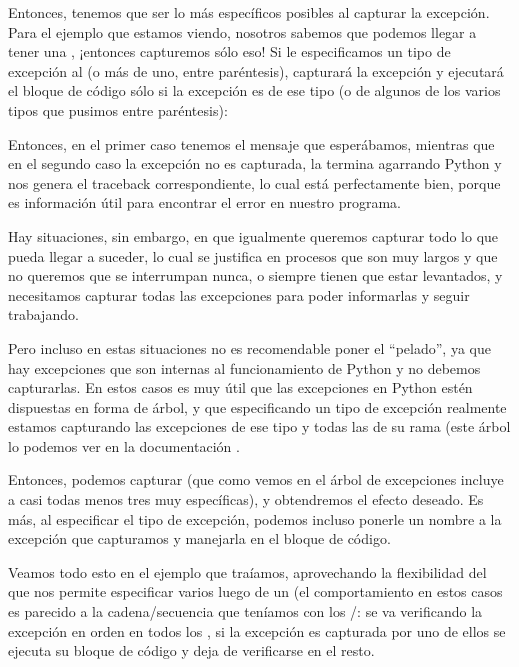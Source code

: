 Entonces, tenemos que ser lo más específicos posibles al capturar la excepción. Para el ejemplo que estamos viendo, nosotros sabemos que podemos llegar a tener una , ¡entonces capturemos sólo eso! Si le especificamos un tipo de excepción al  (o más de uno, entre paréntesis), capturará la excepción y ejecutará el bloque de código sólo si la excepción es de ese tipo (o de algunos de los varios tipos que pusimos entre paréntesis):


Entonces, en el primer caso tenemos el mensaje que esperábamos, mientras que en el segundo caso la excepción no es capturada, la termina agarrando Python y nos genera el traceback correspondiente, lo cual está perfectamente bien, porque es información útil para encontrar el error en nuestro programa.

Hay situaciones, sin embargo, en que igualmente queremos capturar todo lo que pueda llegar a suceder, lo cual se justifica en procesos que son muy largos y que no queremos que se interrumpan nunca, o siempre tienen que estar levantados, y necesitamos capturar todas las excepciones para poder informarlas y seguir trabajando. 

Pero incluso en estas situaciones no es recomendable poner el  ``pelado'', ya que hay excepciones que son internas al funcionamiento de Python y no debemos capturarlas. En estos casos es muy útil que las excepciones en Python estén dispuestas en forma de árbol, y que especificando un tipo de excepción realmente estamos capturando las excepciones de ese tipo y todas las de su rama (este árbol lo podemos ver en la documentación \cite{stdlib_exceptree}. 

Entonces, podemos capturar  (que como vemos en el árbol de excepciones incluye a casi todas menos tres muy específicas), y obtendremos el efecto deseado. Es más, al especificar el tipo de excepción, podemos incluso ponerle un nombre a la excepción que capturamos y manejarla en el bloque de código. 

Veamos todo esto en el ejemplo que traíamos, aprovechando la flexibilidad del  que nos permite especificar varios luego de un  (el comportamiento en estos casos es parecido a la cadena/secuencia que teníamos con los /: se va verificando la excepción en orden en todos los , si la excepción es capturada por uno de ellos se ejecuta su bloque de código y deja de verificarse en el resto.

